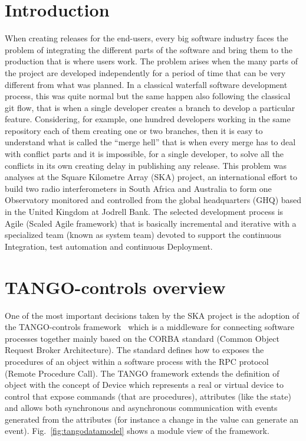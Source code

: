 \documentclass[a4paper,
               keeplastbox,   %
               ]{jacow}
\begin{document}
\section{Introduction}
When creating releases for the end-users, every big software industry faces the problem of integrating the different parts of the software and bring them to the production that is where users work. The problem arises when the many parts of the project are developed independently for a period of time that can be very different from what was planned. In a classical waterfall software development process, this was quite normal but the same happen  also following the classical git flow, that is when a single developer creates a branch to develop a particular feature. Considering, for example, one hundred developers working in the same repository each of them creating one or two branches, then it is easy to understand what is called the “merge hell” that is when every merge has to deal with conflict parts and it is impossible, for a single developer, to solve all the conflicts in its own creating delay in publishing any release. 
This problem was analyses at the Square Kilometre Array (SKA) project, an international effort to build two radio interferometers in South Africa and Australia to form one Observatory monitored and controlled from the global headquarters (GHQ) based in the United Kingdom at Jodrell Bank.  
The selected development process is Agile (Scaled Agile framework) that is basically incremental and iterative with a specialized team (known as system team) devoted to support the continuous Integration, test automation and continuous Deployment.


\section{TANGO-controls overview}
One of the most important decisions taken by the SKA project is the adoption of the TANGO-controls framework~\cite{TANGO-controls} which is a middleware for connecting software processes together mainly based on the CORBA standard (Common Object Request Broker Architecture). The standard defines how to exposes the procedures of an object within a software process with the RPC protocol (Remote Procedure Call).  The TANGO framework extends the definition of object with the concept of Device which represents a real or virtual device to control that expose commands (that are procedures), attributes (like the state) and allows both synchronous and asynchronous communication with events generated from the attributes (for instance a change in the value can generate an event). Fig.~\ref{fig:tangodatamodel}  shows a module view of the framework.
\end{document}
